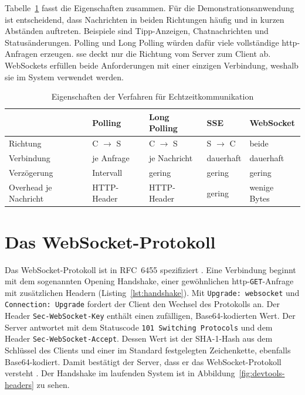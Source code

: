 Tabelle~\ref{tab:verfahren} fasst die Eigenschaften zusammen. Für die Demonstrationsanwendung ist entscheidend, dass Nachrichten in beiden Richtungen häufig und in kurzen Abständen auftreten. Beispiele sind Tipp-Anzeigen, Chatnachrichten und Statusänderungen. Polling und Long Polling würden dafür viele vollständige \gls{http}-Anfragen erzeugen. \gls{sse} deckt nur die Richtung vom Server zum Client ab. WebSockets erfüllen beide Anforderungen mit einer einzigen Verbindung, weshalb sie im System verwendet werden.

\begin{table}[ht]
  \centering
  \caption{Eigenschaften der Verfahren für Echtzeitkommunikation}
  \label{tab:verfahren}
  \sffamily\small
  \begin{tabular}{lllll}
    \toprule
     & \textbf{Polling} & \textbf{Long Polling} & \textbf{SSE} & \textbf{WebSocket} \\
    \midrule
    Richtung & C $\rightarrow$ S & C $\rightarrow$ S & S $\rightarrow$ C & beide \\
    Verbindung & je Anfrage & je Nachricht & dauerhaft & dauerhaft \\
    Verzögerung & Intervall & gering & gering & gering \\
    Overhead je Nachricht & HTTP-Header & HTTP-Header & gering & wenige Bytes \\
    \bottomrule
  \end{tabular}
\end{table}

\section{Das WebSocket-Protokoll}
\label{sec:websocket}

Das WebSocket-Protokoll ist in RFC~6455 spezifiziert \X[RFC 6455]. Eine Verbindung beginnt mit dem sogenannten Opening Handshake, einer gewöhnlichen \gls{http}-\texttt{GET}-Anfrage mit zusätzlichen Headern (Listing~\ref{lst:handshake}). Mit \texttt{Upgrade: websocket} und \texttt{Connection: Upgrade} fordert der Client den Wechsel des Protokolls an. Der Header \texttt{Sec-WebSocket-Key} enthält einen zufälligen, Base64-kodierten Wert. Der Server antwortet mit dem Statuscode \texttt{101 Switching Protocols} und dem Header \texttt{Sec-WebSocket-Accept}. Dessen Wert ist der SHA-1-Hash aus dem Schlüssel des Clients und einer im Standard festgelegten Zeichenkette, ebenfalls Base64-kodiert. Damit bestätigt der Server, dass er das WebSocket-Protokoll versteht . Der Handshake im laufenden System ist in Abbildung~\ref{fig:devtools-headers} zu sehen.

